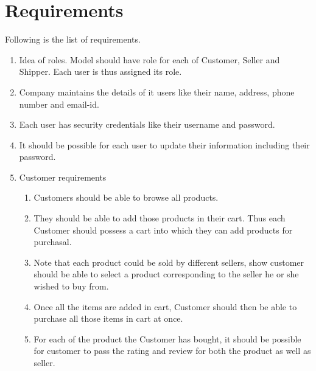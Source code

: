 \documentclass[a4paper,12pt]{article}
\begin{document}
\section{Requirements}
Following is the list of requirements.
\begin{enumerate}
  \item Idea of roles. Model should have role for each of Customer, Seller and Shipper. Each user is thus assigned its role.

  \item Company maintains the details of it users like their name, address, phone number and email-id.

  \item Each user has security credentials like their username and password.
  \item It should be possible for each user to update their information including their password.
  \item Customer requirements
  \begin{enumerate}
    \item Customers should be able to browse all products.
    \item They should be able to add those products in their cart. Thus each Customer should possess a cart into which they can add products for purchasal.
    \item Note that each product could be sold by different sellers, show customer should be able to select a product corresponding to the seller he or she wished to buy from. 
    \item Once all the items are added in cart, Customer should then be able to purchase all those items in cart at once.
    \item For each of the product the Customer has bought, it should be possible for customer to pass the rating and review for both the product as well as seller. 
  \end{enumerate}


\end{enumerate}
\end{document}
